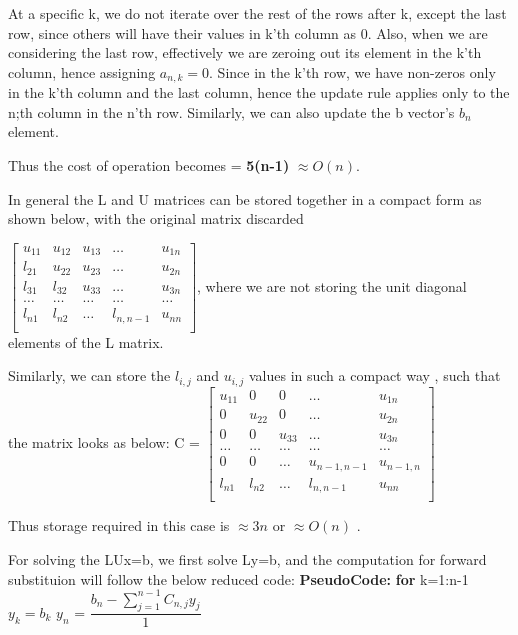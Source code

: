 \documentclass{article}
\newcommand\pseudoCode{\vspace{.10in}\textbf{PseudoCode: }}
\begin{document}
At a specific k, we do not iterate over the rest of the rows after k, except the last row, since others will have their values in k'th column as 0. Also, when we are considering the last row, effectively we are zeroing out its element in the k'th column, hence assigning $a_{n,k}=0$. Since in the k'th row, we have non-zeros only in the k'th column and the last column, hence the update rule applies only to the n;th column in the n'th row. Similarly, we can also update the b vector's $b_{n}$ element. \newline

Thus the cost of operation becomes = \textbf {5(n-1)} $\approx O(n)$. \newline

In general the L and U matrices can be stored together in a compact form as shown below, with the original matrix discarded\newline

$\begin{bmatrix}
 u_{11} & u_{12} & u_{13} & \dots & u_{1n} \\
  l_{21} & u_{22} & u_{23} & \dots & u_{2n} \\
  l_{31} & l_{32} & u_{33} & \dots & u_{3n} \\
 \dots & \dots & \dots & \dots & \dots \\
  l_{n1} & l_{n2} & \dots & l_{n,n-1} & u_{nn} \\
\end{bmatrix}$, where we are not storing the unit diagonal elements of the L matrix. \newline

Similarly, we can store the $l_{i,j}$ and $u_{i,j}$ values in such a compact way , such that the matrix looks as below: \newline
C = $\begin{bmatrix}
 u_{11} & 0 & 0 & \dots & u_{1n} \\
  0 & u_{22} & 0 & \dots & u_{2n} \\
  0 & 0 & u_{33} & \dots & u_{3n} \\
 \dots & \dots & \dots & \dots & \dots \\
  0 & 0 & \dots & u_{n-1,n-1} & u_{n-1,n} \\
  l_{n1} & l_{n2} & \dots & l_{n,n-1} & u_{nn} \\
\end{bmatrix}$

Thus storage required in this case is $\approx 3n$ or $\approx O(n)$ .

For solving the LUx=b, we first solve Ly=b, and the computation for forward substituion will follow the below reduced code: \newline
\pseudoCode \newline
  \textbf {for} k=1:n-1 \newline
  \hspace*{1cm} $y_{k} = b_{k}$ \newline
   $y_{n}$ = $\dfrac{b_{n} - \sum_{j=1}^{n-1} C_{n,j}y_{j}}{1}$ \newline
\end{document}
